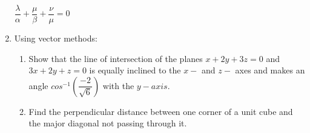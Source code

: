 \documentclass[fleqn]{article}
\begin{document}
\begin{enumerate}
  $\dfrac{\lambda}{\alpha}+\dfrac{\mu}{\beta}+\dfrac{\nu}{\mu}=0$

  \item  Using vector methods:

  \begin{enumerate}
    \item Show that the line of intersection of the planes $x+2y+3z=0$ and $3x+2y+z=0$ is equally inclined to the $x-$ and $z-$ axes and makes an angle $cos^{-1}(\dfrac{-2}{\sqrt{6}})$ with the $y-axis$.
    
    \item Find the perpendicular distance between one corner of a unit cube and the major diagonal not passing through it.
  \end{enumerate} 
  
\end{enumerate}

\end{document}

